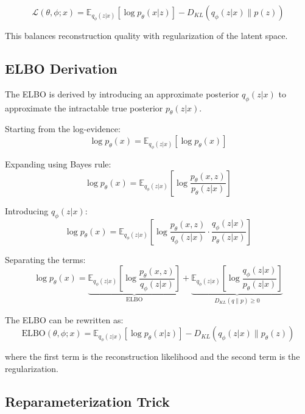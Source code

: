 \documentclass[conference]{IEEEtran}
\begin{document}
\begin{equation}
\mathcal{L}(\theta, \phi; x) = \mathbb{E}_{q_\phi(z|x)} \left[ \log p_\theta(x|z) \right] - D_{KL}(q_\phi(z|x) \| p(z))
\label{eq:elbo}
\end{equation}

This balances reconstruction quality with regularization of the latent space.

\subsection{ELBO Derivation}

The ELBO is derived by introducing an approximate posterior $q_\phi(z|x)$ to approximate the intractable true posterior $p_\theta(z|x)$.

Starting from the log-evidence:
\begin{equation}
\log p_\theta(x) = \mathbb{E}_{q_\phi(z|x)} \left[ \log p_\theta(x) \right]
\end{equation}

Expanding using Bayes rule:
\begin{equation}
\log p_\theta(x) = \mathbb{E}_{q_\phi(z|x)} \left[ \log \frac{p_\theta(x, z)}{p_\theta(z|x)} \right]
\end{equation}

Introducing $q_\phi(z|x)$:
\begin{equation}
\log p_\theta(x) = \mathbb{E}_{q_\phi(z|x)} \left[ \log \frac{p_\theta(x, z)}{q_\phi(z|x)} \cdot \frac{q_\phi(z|x)}{p_\theta(z|x)} \right]
\end{equation}

Separating the terms:
\begin{equation}
\log p_\theta(x) = \underbrace{\mathbb{E}_{q_\phi(z|x)} \left[ \log \frac{p_\theta(x, z)}{q_\phi(z|x)} \right]}_{\text{ELBO}} + \underbrace{\mathbb{E}_{q_\phi(z|x)} \left[ \log \frac{q_\phi(z|x)}{p_\theta(z|x)} \right]}_{D_{KL}(q \| p) \geq 0}
\end{equation}

The ELBO can be rewritten as:
\begin{equation}
\text{ELBO}(\theta, \phi; x) = \mathbb{E}_{q_\phi(z|x)} \left[ \log p_\theta(x|z) \right] - D_{KL}(q_\phi(z|x) \| p_\theta(z))
\end{equation}

where the first term is the reconstruction likelihood and the second term is the regularization.

\subsection{Reparameterization Trick}
\end{document}
